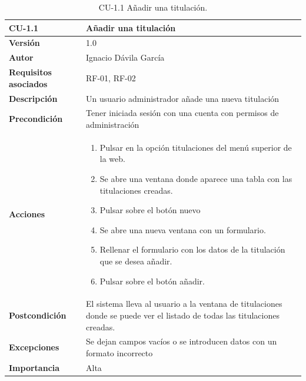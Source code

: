 \begin{table}[p]
	\centering
	\begin{tabularx}{\linewidth}{ p{} p{} }
		\toprule
		\textbf{CU-1.1}    & \textbf{Añadir una titulación}\\
		\toprule
		\textbf{Versión}              & 1.0    \\
		\textbf{Autor}                & Ignacio Dávila García \\
		\textbf{Requisitos asociados} & RF-01, RF-02 \\
		\textbf{Descripción}          & Un usuario administrador añade una nueva titulación \\
		\textbf{Precondición}         & Tener iniciada sesión con una cuenta con permisos de administración \\
		\textbf{Acciones}             &
		\begin{enumerate}
			\def\labelenumi{\arabic{enumi}.}
			\tightlist
			\item Pulsar en la opción titulaciones del menú superior de la web.
			\item Se abre una ventana donde aparece una tabla con las titulaciones creadas.
			\item Pulsar sobre el botón nuevo
			\item Se abre una nueva ventana con un formulario.
			\item Rellenar el formulario con los datos de la titulación que se desea añadir.
			\item Pulsar sobre el botón añadir.
		\end{enumerate}\\
		\textbf{Postcondición}        & El sistema lleva al usuario a la ventana de titulaciones donde se puede ver el listado de todas las titulaciones creadas. \\
		\textbf{Excepciones}          & Se dejan campos vacíos o se introducen datos con un formato incorrecto \\
		\textbf{Importancia}          & Alta \\
		\bottomrule
	\end{tabularx}
	\caption{CU-1.1 Añadir una titulación.}
\end{table}

